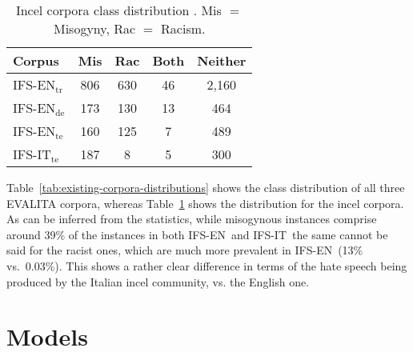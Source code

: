 \documentclass[11pt]{article}
\newcommand{\todoP}[1]{\todo[color=red]{P: #1}}
\newcommand{\dsENclassification}{IFS-EN}
\newcommand{\dsITclassification}{IFS-IT}
\newcommand{\dsENclassificationtrain}{IFS-EN$_{\mbox{tr}}$} %
\newcommand{\dsENclassificationdev}{IFS-EN$_{\mbox{de}}$} %
\newcommand{\dsENclassificationtest}{IFS-EN$_{\mbox{te}}$} %
\begin{document}
\begin{table}[t]
  \caption{Incel corpora class distribution \cite{gajo2023identification}. Mis $=$ Misogyny, Rac $=$ Racism.}
  \label{tab:incel-corpora-distributions}
  \centering
  \begin{tabular}{l|cccc}
    \hline
    \bf Corpus                & \bf Mis & \bf Rac & \bf Both & \bf  Neither \\
    \hline
    \dsENclassificationtrain\,	&  806 & 630 & 46 &
  2,160 \\
    \dsENclassificationdev 	&  173 & 130 & 13 & 464 \\
    \dsENclassificationtest 	&  160 & 125 & 7 & 489 \\
    \dsITclassification$_{\mbox{te}}$  & 187 & 8 & 5 & 300 \\
    \hline
    \end{tabular}
\end{table}

Table~\ref{tab:existing-corpora-distributions} shows the class distribution of all three EVALITA corpora, whereas
Table~\ref{tab:incel-corpora-distributions} shows the distribution for the incel corpora. As can be inferred from the statistics, while misogynous instances comprise around 39\% of the instances in both \dsENclassification\, and \dsITclassification\, the same cannot be said for the racist ones, which are much more prevalent in \dsENclassification\, (13\% vs.\ 0.03\%). This shows a rather clear difference in terms of the hate speech being produced by the Italian incel community, vs. the English one.

\section{Models}
\label{sec:models}
\end{document}

